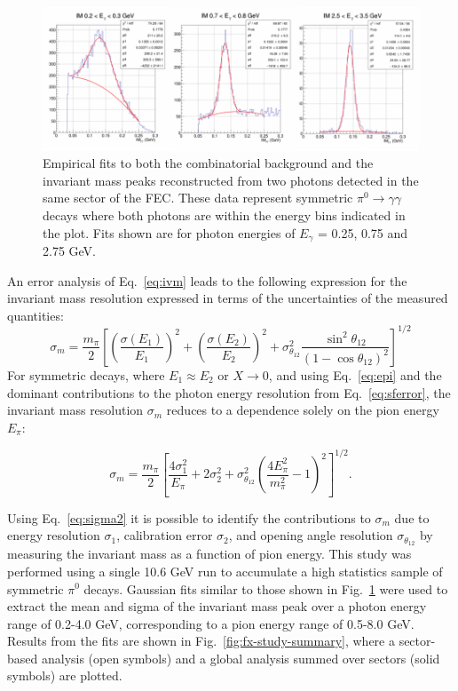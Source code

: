\begin{figure}[h]
\centering
\includegraphics[width=1.0\columnwidth,keepaspectratio]{img/fx-pi0-fits.png}
\caption[]{Empirical fits to both the combinatorial background and the invariant mass peaks reconstructed from two photons detected in the same sector of the FEC.  These data represent symmetric $\pi^0 \rightarrow \gamma \gamma$ decays where both photons are within the energy bins indicated in the plot. Fits shown are for photon energies of $E_{\gamma}$ = 0.25, 0.75 and 2.75 GeV.}
\label{fig:fx-pi0-fits}
\end{figure}

An error analysis of Eq.~\ref{eq:ivm} leads to the following expression for the invariant mass resolution expressed in terms of the uncertainties of the measured quantities:
\begin{equation}
\sigma_m  = \frac{m_{\pi}}{2}\left[\left(\frac{\sigma(E_1)}{E_1}\right)^2 + \left(\frac{\sigma(E_2)}{E_2}\right)^2 + \sigma^2_{\theta_{12}}\frac{\sin^2 \theta_{12}}{(1-\cos \theta_{12})^2}\right]^{1/2}
\label{eq:sigmam1}
\end{equation}
For symmetric decays, where $E_1 \approx E_2$ or $X \rightarrow 0$, and using Eq.~\ref{eq:epi} and the dominant contributions to the photon energy resolution from Eq.~\ref{eq:sferror}, the invariant mass resolution $\sigma_m$ reduces to a dependence solely on the pion energy $E_{\pi}$:

\begin{equation}
\sigma_m = \frac{m_{\pi}}{2}\left[\frac{4 \sigma^2_1}{E_{\pi}} + 2 \sigma^2_2 + \sigma^2_{\theta_{12}}\left(\frac{4 E^2_{\pi}}{m^2_{\pi}}-1\right)^2\right]^{1/2}.
\label{eq:sigma2}
\end{equation}

Using Eq.~\ref{eq:sigma2} it is possible to identify the contributions to $\sigma_m$ due to energy resolution $\sigma_1$, calibration error $\sigma_2$, and opening angle resolution $\sigma_{\theta_{12}}$ by measuring the invariant mass as a function of pion energy.  This study was performed using a single 10.6 GeV run to accumulate a high statistics sample of symmetric $\pi^{0}$ decays.  Gaussian fits similar to those shown in Fig.~\ref{fig:fx-pi0-fits} were used to extract the mean and sigma of the invariant mass peak over a photon energy range of 0.2-4.0 GeV, corresponding to a pion energy range of 0.5-8.0 GeV.  Results from the fits are shown in Fig.~\ref{fig:fx-study-summary}, where a sector-based analysis (open symbols) and a global analysis summed over sectors (solid symbols) are plotted.  

